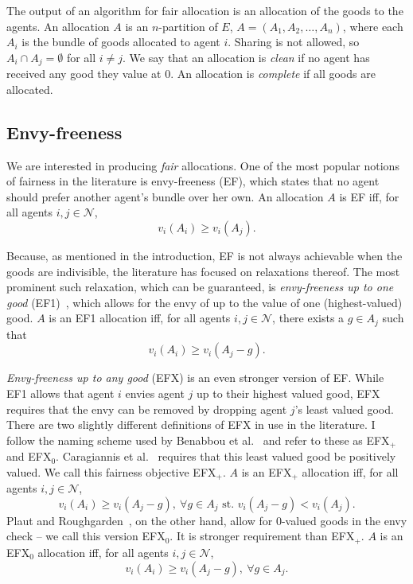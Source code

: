 The output of an algorithm for fair allocation is an allocation of the goods to the agents. An allocation $A$ is an $n$-partition of $E$, $A = (A_1, A_2, \dots, A_n)$, where each $A_i$ is the bundle of goods allocated to agent $i$. Sharing is not allowed, so $A_i\cap A_j = \emptyset$ for all $i\neq j$. We say that an allocation is \textit{clean} if no agent has received any good they value at 0. An allocation is \textit{complete} if all goods are allocated.

\subsection{Envy-freeness}
We are interested in producing \textit{fair} allocations. One of the most popular notions of fairness in the literature is envy-freeness (EF), which states that no agent should prefer another agent's bundle over her own. An allocation $A$ is EF iff, for all agents $i,j\in \mathcal{N}$,
\begin{equation} \tag{EF}
  v_i(A_i) \geq v_i(A_j).
\end{equation}

Because, as mentioned in the introduction, EF is not always achievable when the goods are indivisible, the literature has focused on relaxations thereof. The most prominent such relaxation, which can be guaranteed, is \textit{envy-freeness up to one good} (EF1)~\cite{lipton-2004}, which allows for the envy of up to the value of one (highest-valued) good. $A$ is an EF1 allocation iff, for all agents $i,j \in \mathcal{N}$, there exists a $g \in A_j$ such that
\begin{equation} \tag{EF1}
  v_i(A_i) \geq v_i(A_j - g).
\end{equation}

\textit{Envy-freeness up to any good} (EFX) is an even stronger version of EF. While EF1 allows that agent $i$ envies agent $j$ up to their highest valued good, EFX requires that the envy can be removed by dropping agent $j$'s least valued good. There are two slightly different definitions of EFX in use in the literature. I follow the naming scheme used by Benabbou et al.~\cite{benabbou-2021} and refer to these as EFX$_+$ and EFX$_0$. Caragiannis et al.~\cite{caragiannis-Unreasonable} requires that this least valued good be positively valued. We call this fairness objective EFX$_+$. $A$ is an EFX$_+$ allocation iff, for all agents $i,j \in \mathcal{N}$,
\begin{equation} \tag{EFX$_+$}
  v_i(A_i) \geq v_i(A_j - g),\ \forall g \in A_j \text{ st. } v_i(A_j-g) < v_i(A_j).
\end{equation}
Plaut and Roughgarden~\cite{plaut2017envyfreeness}, on the other hand, allow for 0-valued goods in the envy check -- we call this version EFX$_0$. It is stronger requirement than EFX$_+$. $A$ is an EFX$_0$ allocation iff, for all agents $i,j \in \mathcal{N}$,
\begin{equation} \tag{EFX$_0$}
  v_i(A_i) \geq v_i(A_j - g),\ \forall g \in A_j.
\end{equation}

